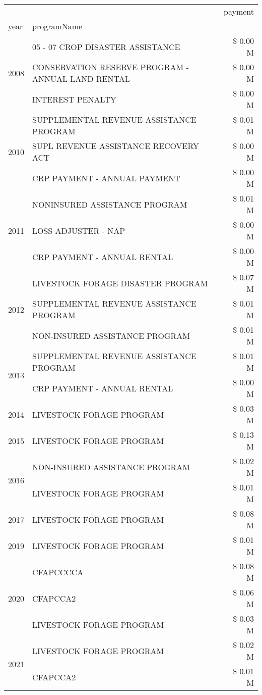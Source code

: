 \begin{tabular}{llr}
\toprule
 &  & payment \\
year & programName &  \\
\midrule
\multirow[t]{3}{*}{2008} & 05 - 07 CROP DISASTER ASSISTANCE & \$ 0.00 M \\
 & CONSERVATION RESERVE PROGRAM - ANNUAL LAND RENTAL & \$ 0.00 M \\
 & INTEREST PENALTY & \$ 0.00 M \\
\cline{1-3}
\multirow[t]{3}{*}{2010} & SUPPLEMENTAL REVENUE ASSISTANCE PROGRAM & \$ 0.01 M \\
 & SUPL REVENUE ASSISTANCE RECOVERY ACT & \$ 0.00 M \\
 & CRP PAYMENT - ANNUAL PAYMENT & \$ 0.00 M \\
\cline{1-3}
\multirow[t]{3}{*}{2011} & NONINSURED ASSISTANCE PROGRAM & \$ 0.01 M \\
 & LOSS ADJUSTER - NAP & \$ 0.00 M \\
 & CRP PAYMENT - ANNUAL RENTAL & \$ 0.00 M \\
\cline{1-3}
\multirow[t]{3}{*}{2012} & LIVESTOCK FORAGE DISASTER PROGRAM & \$ 0.07 M \\
 & SUPPLEMENTAL REVENUE ASSISTANCE PROGRAM & \$ 0.01 M \\
 & NON-INSURED ASSISTANCE PROGRAM & \$ 0.01 M \\
\cline{1-3}
\multirow[t]{2}{*}{2013} & SUPPLEMENTAL REVENUE ASSISTANCE PROGRAM & \$ 0.01 M \\
 & CRP PAYMENT - ANNUAL RENTAL & \$ 0.00 M \\
\cline{1-3}
2014 & LIVESTOCK FORAGE PROGRAM & \$ 0.03 M \\
\cline{1-3}
2015 & LIVESTOCK FORAGE PROGRAM & \$ 0.13 M \\
\cline{1-3}
\multirow[t]{2}{*}{2016} & NON-INSURED ASSISTANCE PROGRAM                & \$ 0.02 M \\
 & LIVESTOCK FORAGE PROGRAM                      & \$ 0.01 M \\
\cline{1-3}
2017 & LIVESTOCK FORAGE PROGRAM & \$ 0.08 M \\
\cline{1-3}
2019 & LIVESTOCK FORAGE PROGRAM & \$ 0.01 M \\
\cline{1-3}
\multirow[t]{3}{*}{2020} & CFAPCCCCA & \$ 0.08 M \\
 & CFAPCCA2 & \$ 0.06 M \\
 & LIVESTOCK FORAGE PROGRAM & \$ 0.03 M \\
\cline{1-3}
\multirow[t]{2}{*}{2021} & LIVESTOCK FORAGE PROGRAM & \$ 0.02 M \\
 & CFAPCCA2 & \$ 0.01 M \\
\cline{1-3}
\bottomrule
\end{tabular}
